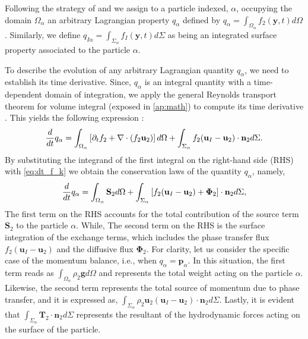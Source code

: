Following the strategy of \citet{zaepffel2011modelisation} and \citet[Chapter 2]{morel2015mathematical} we assign to a particle indexed, $\alpha$, occupying the domain $\Omega_\alpha$ an arbitrary Lagrangian property $q_\alpha$ defined by $q_\alpha  = \int_{\Omega_\alpha} f_2(\textbf{y},t) d\Omega$.
Similarly, we define $q_{I\alpha} = \int_{\Sigma_\alpha} f_I(\textbf{y},t) d\Sigma$ as being an integrated surface property associated to the particle $\alpha$.

To describe the evolution of any arbitrary Lagrangian quantity $q_\alpha$, we need to establish its time derivative.
Since, $q_\alpha$ is an integral quantity with a time-dependent domain of integration, we apply the general Reynolds transport theorem for volume integral (exposed in \ref{ap:math}) to compute its time derivative \citep{morel2015mathematical}.
This yields the following expression :
\begin{equation}
    \frac{d}{d t}  q_\alpha
    = \int_{\Omega_\alpha}\left[ \partial_t f_2 + \mathbf{\nabla} \cdot\left(f_2\textbf{u}_2\right) \right]d\Omega\\
    + \int_{\Sigma_\alpha} f_2 (\textbf{u}_I-\textbf{u}_2)\cdot \textbf{n}_2 d\Sigma.
\end{equation}
By substituting the integrand of the first integral on the right-hand side (RHS) with \ref{eq:dt_f_k} we obtain the conservation laws of the quantity $q_\alpha$, namely,  
\begin{equation}
    \frac{d}{d t}  q_\alpha
    = \int_{\Omega_\alpha} \textbf{S}_2 d\Omega
    + \int_{\Sigma_\alpha} \left[
        f_2 (\textbf{u}_I-\textbf{u}_2) 
        + \mathbf{\Phi}_2 
        \right] \cdot \textbf{n}_2 d\Sigma,
    \label{eq:dt_q_alpha}
\end{equation}
The first term on the RHS accounts for the total contribution of the source term $\textbf{S}_2$ to the particle $\alpha$.
While, The second term on the RHS is the surface integration of the exchange terms, which includes the phase transfer flux $f_2 (\textbf{u}_I-\textbf{u}_2)$ and the diffusive flux $\mathbf{\Phi}_2$. 
For clarity, let us consider the specific case of the momentum balance, i.e., when $q_\alpha = \textbf{p}_\alpha$.
In this situation, the first term reads as $\int_{\Omega_\alpha} \rho_2\textbf{g} d\Omega$ and represents the total weight acting on the particle $\alpha$. 
Likewise, the second term represents the total source of momentum due to phase transfer, and it is expressed as, $\int_{\Sigma_\alpha} \rho_2 \textbf{u}_2 (\textbf{u}_I-\textbf{u}_2)\cdot\textbf{n}_2 d\Sigma$. 
Lastly, it is evident that $\int_{\Sigma_\alpha} \textbf{T}_2\cdot\textbf{n}_2 d\Sigma$ represents the resultant of the hydrodynamic forces acting on the surface of the particle.
